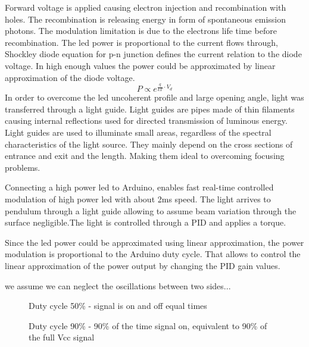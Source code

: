 \documentclass[\main/master.tex]{subfiles}
\begin{document}
\par\noindent
Forward voltage is applied causing electron injection and recombination with holes. The recombination is releasing energy in form of spontaneous emission photons. The modulation limitation is due to the electrons life time before recombination. The led power is proportional to the current flows through, Shockley diode equation for p-n junction defines the current relation to the diode voltage. In high enough values the power could be approximated by linear approximation of the diode voltage.
\begin{equation}
P\propto e^{\frac{q}{kT}\cdot V_d}\label{eqn:energy-mass-equivalence-relation}
\end{equation}
In order to overcome the led uncoherent profile and large opening angle, light was transferred through a light guide. Light guides are pipes made of thin filaments causing internal reflections used for directed transmission of luminous energy. Light guides are used to illuminate small areas, regardless of the spectral characteristics of the light source. They mainly depend on the cross sections of entrance and exit and the length. Making them ideal to overcoming focusing problems.
\par\noindent
Connecting a high power led to Arduino, enables fast real-time controlled modulation of high power led with about 2ms speed. The light arrives to pendulum through a light guide allowing to assume beam variation through the surface negligible.The light is controlled through a PID and applies a torque.
\par\noindent
Since the led power could be approximated using linear approximation, the power modulation is proportional to the Arduino duty cycle. That allows to control the linear approximation of the power output by changing the PID gain values.  
\par\noindent
we assume we can neglect the oscillations between two sides...



\begin{figure}[htbp]
	\centering
	\caption[Duty cycle 50\%]{Duty cycle 50\%  - signal is on and off equal times}
	\label{fig:duty50}
\end{figure}
 
\begin{figure}[htbp]
	\centering
	\caption[Duty cycle 90\%]{Duty cycle 90\% - 90\% of the time signal on, equivalent to 90\% of the full Vcc signal}
	\label{fig:duty90}
\end{figure}
\end{document}
